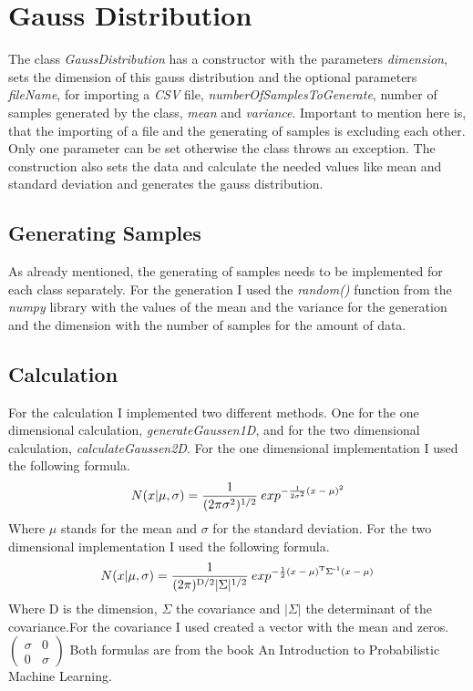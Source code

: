 \documentclass[10pt, a4paper, twocolumn]{article} %
\begin{document}
\section{Gauss Distribution}
The class \textit{GaussDistribution} has a constructor with the parameters \textit{dimension}, sets the dimension of this gauss distribution and the optional parameters \textit{fileName}, for importing a \textit{CSV} file, \textit{numberOfSamplesToGenerate}, number of samples generated by the class, \textit{mean} and  \textit{variance}. Important to mention here is, that the importing of a file and the generating of samples is excluding each other. Only one parameter can be set otherwise the class throws an exception. The construction also sets the data and calculate the needed values like mean and standard deviation and generates the gauss distribution. 

\subsection{Generating Samples}
As already mentioned, the generating of samples needs to be implemented for each class separately. For the generation I used the \textit{random()} function from the \textit{numpy} library with the values of the mean and the variance for the generation and the dimension with the number of samples for the amount of data. 



\subsection{Calculation}
For the calculation I implemented two different methods. One for the one dimensional calculation, \textit{generateGaussen1D}, and for the two dimensional calculation, \textit{calculateGaussen2D}. For the one dimensional implementation I used the following formula. 
\[
N(x|\mu,\sigma) = \frac{1}{(2\pi\sigma\textsuperscript{2})\textsuperscript{1/2}}\:exp
\textsuperscript{$-\frac{1}{2\sigma\textsuperscript{2}}(x-\mu)\textsuperscript{2}$}
\]
Where $\mu$ stands for the mean and $\sigma$ for the standard deviation. For the two dimensional implementation I used the following formula. 
\[
N(x|\mu,\sigma) = \frac{1}{(2\pi)\textsuperscript{D/2} \vert\Sigma\vert\textsuperscript{1/2}}\:exp\textsuperscript{$-\frac{1}{2}(x-\mu)\textsuperscript{T}\Sigma\textsuperscript{-1}(x-\mu)$}
\]
Where D is the dimension, $\Sigma$ the covariance and $\vert\Sigma\vert$ the determinant of the covariance.For the covariance I used created a vector with the mean and zeros.
$\begin{pmatrix}
\sigma & 0\\
0 & \sigma
\end{pmatrix}$
Both formulas are from the book An Introduction to Probabilistic Machine Learning.  
\citep{bookMachineLearning}
\end{document}
